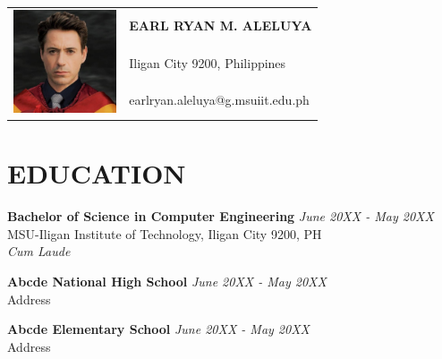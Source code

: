 
\newpage
\thispagestyle{empty}

{}

\begin{table}[ht]
    \label{tab:cv-personal-info}
    \begin{tabular}{ll}
    \multirow{3}{*}{\includegraphics[width=1.2in]{images/gradpic_no-cap.jpg}} 
                         & \textbf{\large EARL RYAN M. ALELUYA} \\
                         & \faMapO{} Iligan City 9200, Philippines              \\
                         & \faEnvelopeO{} earlryan.aleluya@g.msuiit.edu.ph               
    \end{tabular}
\end{table}



\vspace{3em}
\section*{\faGraduationCap{} EDUCATION}
    \noindent
    \textbf{\small Bachelor of Science in Computer Engineering} \hfill \textit{June 20XX - May 20XX} \\
    \small MSU-Iligan Institute of Technology, Iligan City 9200, PH \\
    \small \textit{Cum Laude} 
    
    \vspace{1em} \noindent
    \textbf{\small Abcde National High School} \hfill \textit{June 20XX - May 20XX} \\
    \small Address

    \vspace{1em} \noindent
    \textbf{\small Abcde Elementary School} \hfill \textit{June 20XX - May 20XX} \\
    \small Address


